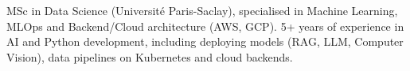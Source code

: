 

\begin{cvparagraph}

MSc in Data Science (Université Paris-Saclay), specialised in Machine Learning, MLOps and Backend/\allowbreak Cloud architecture (AWS, GCP). 5+ years of experience in AI and Python development, including deploying models (RAG, LLM, Computer Vision), data pipelines on Kubernetes and cloud backends.
\end{cvparagraph}
